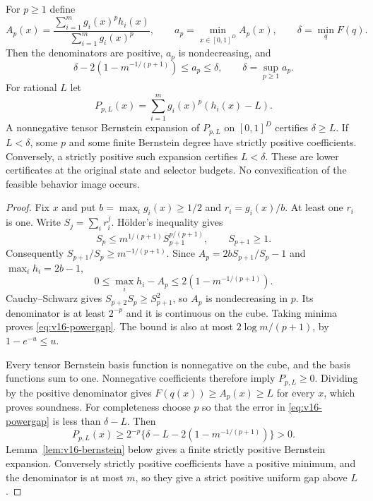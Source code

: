 \begin{theorem}
\label{thm:v16-dual}
For $p\ge1$ define
\[
 A_p(x)=\frac{\sum_{i=1}^m g_i(x)^p h_i(x)}
                    {\sum_{i=1}^m g_i(x)^p},
 \qquad a_p=\min_{x\in[0,1]^D}A_p(x),
 \qquad \delta=\min_q F(q).
\]
Then the denominators are positive, $a_p$ is nondecreasing, and
\begin{equation}\label{eq:v16-powergap}
 \delta-2(1-m^{-1/(p+1)})\le a_p\le\delta,
 \qquad \delta=\sup_{p\ge1}a_p.
\end{equation}
For rational $L$ let
\begin{equation}\label{eq:v16-positivepoly}
 P_{p,L}(x)=\sum_{i=1}^m g_i(x)^p(h_i(x)-L).
\end{equation}
A nonnegative tensor Bernstein expansion of $P_{p,L}$ on $[0,1]^D$
certifies $\delta\ge L$. If $L<\delta$, some $p$ and some finite
Bernstein degree have strictly positive coefficients. Conversely, a
strictly positive such expansion certifies $L<\delta$.
These are lower certificates at the original state and selector
budgets. No convexification of the feasible behavior image occurs.
\end{theorem}
\begin{proof}
Fix $x$ and put $b=\max_i g_i(x)\ge1/2$ and $r_i=g_i(x)/b$.
At least one $r_i$ is one. Write $S_j=\sum_i r_i^j$. H\"older's
inequality gives
\[
 S_p\le m^{1/(p+1)}S_{p+1}^{p/(p+1)},\qquad S_{p+1}\ge1.
\]
Consequently $S_{p+1}/S_p\ge m^{-1/(p+1)}$. Since
$A_p=2bS_{p+1}/S_p-1$ and $\max_i h_i=2b-1$,
\[
 0\le\max_i h_i-A_p\le2(1-m^{-1/(p+1)}).
\]
Cauchy--Schwarz gives $S_{p+2}S_p\ge S_{p+1}^2$, so $A_p$ is
nondecreasing in $p$. Its denominator is at least $2^{-p}$ and it is
continuous on the cube. Taking minima proves
\eqref{eq:v16-powergap}. The bound is also at most $2\log m/(p+1)$,
by $1-e^{-u}\le u$.

Every tensor Bernstein basis function is nonnegative on the cube, and
the basis functions sum to one. Nonnegative coefficients therefore
imply $P_{p,L}\ge0$. Dividing by the positive denominator gives
$F(q(x))\ge A_p(x)\ge L$ for every $x$, which proves soundness.
For completeness choose $p$ so that the error in
\eqref{eq:v16-powergap} is less than $\delta-L$. Then
\[
 P_{p,L}(x)\ge2^{-p}\{\delta-L-2(1-m^{-1/(p+1)})\}>0.
\]
Lemma~\ref{lem:v16-bernstein} below gives a finite strictly positive
Bernstein expansion. Conversely strictly positive coefficients have a
positive minimum, and the denominator is at most $m$, so they give a
strict positive uniform gap above $L$.
\end{proof}


